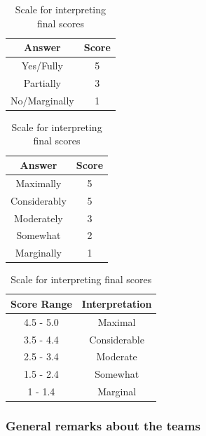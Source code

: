 \begin{table}
\RawFloats %
 \begin{minipage}{.3\textwidth}
  \caption{Scale for Capability}
  \label{table:capability_scale}
  \begin{tabular}{| c | c |}
 \hline
 \textbf{Answer} & \textbf{Score} \\ \hline
 Yes/Fully & 5 \\ \hline
 Partially & 3 \\ \hline
 No/Marginally & 1 \\ \hline 
 \end{tabular}
 \end{minipage}%
%
 \begin{minipage}{.35\textwidth}
  \centering
 \caption{Scale for Effectiveness}
 \label{table:effectiveness_scale}
  \begin{tabular}{| c | c |}
 \hline
 \textbf{Answer} & \textbf{Score} \\ \hline
 Maximally & 5 \\ \hline
 Considerably & 5 \\ \hline
 Moderately & 3 \\ \hline
 Somewhat & 2 \\ \hline
 Marginally & 1 \\ \hline 
 \end{tabular}
 \end{minipage}%
 \begin{minipage}{.35\textwidth}
  \caption{Scale for interpreting final scores}
  \label{table:scale_for_final_scores}
  \centering
 \begin{tabular}{| c | c |}
 \hline
 \textbf{Score Range} & \textbf{Interpretation} \\ \hline
 4.5 - 5.0 & Maximal \\ \hline
 3.5 - 4.4 & Considerable \\ \hline
 2.5 - 3.4 & Moderate \\ \hline
 1.5 - 2.4 & Somewhat \\ \hline
 1 - 1.4 & Marginal \\ \hline 
 \end{tabular}
 \end{minipage}%
\end{table}



\subsubsection{General remarks about the teams}

